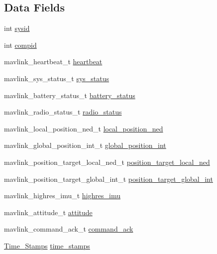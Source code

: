 \subsection*{Data Fields}
\begin{DoxyCompactItemize}
\item 
int \hyperlink{struct_mavlink___messages_a7a9e72f297c762c6d1b36c4c1f83a7ec}{sysid}
\item 
int \hyperlink{struct_mavlink___messages_af0d634d7b4bfadf921b2e991039d38a6}{compid}
\item 
mavlink\+\_\+heartbeat\+\_\+t \hyperlink{struct_mavlink___messages_a7ae2affcf7148de15c05eebf74909e58}{heartbeat}
\item 
mavlink\+\_\+sys\+\_\+status\+\_\+t \hyperlink{struct_mavlink___messages_ae30043ef99cf3612838c79efec1baf8d}{sys\+\_\+status}
\item 
mavlink\+\_\+battery\+\_\+status\+\_\+t \hyperlink{struct_mavlink___messages_a1d01753b58f387b8cc6d59391569dda5}{battery\+\_\+status}
\item 
mavlink\+\_\+radio\+\_\+status\+\_\+t \hyperlink{struct_mavlink___messages_a7aa8a2cdcbccb7f5696ce796e7db2194}{radio\+\_\+status}
\item 
mavlink\+\_\+local\+\_\+position\+\_\+ned\+\_\+t \hyperlink{struct_mavlink___messages_acf461f86d07049bd708dd4ac360f6da3}{local\+\_\+position\+\_\+ned}
\item 
mavlink\+\_\+global\+\_\+position\+\_\+int\+\_\+t \hyperlink{struct_mavlink___messages_a6d6095b510c6396262d76cfae41dea27}{global\+\_\+position\+\_\+int}
\item 
mavlink\+\_\+position\+\_\+target\+\_\+local\+\_\+ned\+\_\+t \hyperlink{struct_mavlink___messages_a1b80bbd13b6a7f75c436b16366a9bcf3}{position\+\_\+target\+\_\+local\+\_\+ned}
\item 
mavlink\+\_\+position\+\_\+target\+\_\+global\+\_\+int\+\_\+t \hyperlink{struct_mavlink___messages_ab87a0a7af2333a7fe491bbb3f44dfb29}{position\+\_\+target\+\_\+global\+\_\+int}
\item 
mavlink\+\_\+highres\+\_\+imu\+\_\+t \hyperlink{struct_mavlink___messages_afa03c0593ea0c41e2835bc771bbc7376}{highres\+\_\+imu}
\item 
mavlink\+\_\+attitude\+\_\+t \hyperlink{struct_mavlink___messages_a47b4f113f51db6752e7a800d10afffa3}{attitude}
\item 
mavlink\+\_\+command\+\_\+ack\+\_\+t \hyperlink{struct_mavlink___messages_a3ef05502567cfd552330d9ede9a89552}{command\+\_\+ack}
\item 
\hyperlink{struct_time___stamps}{Time\+\_\+\+Stamps} \hyperlink{struct_mavlink___messages_aaa9e25fa47c4a823e4d15ce2798286f1}{time\+\_\+stamps}
\end{DoxyCompactItemize}


